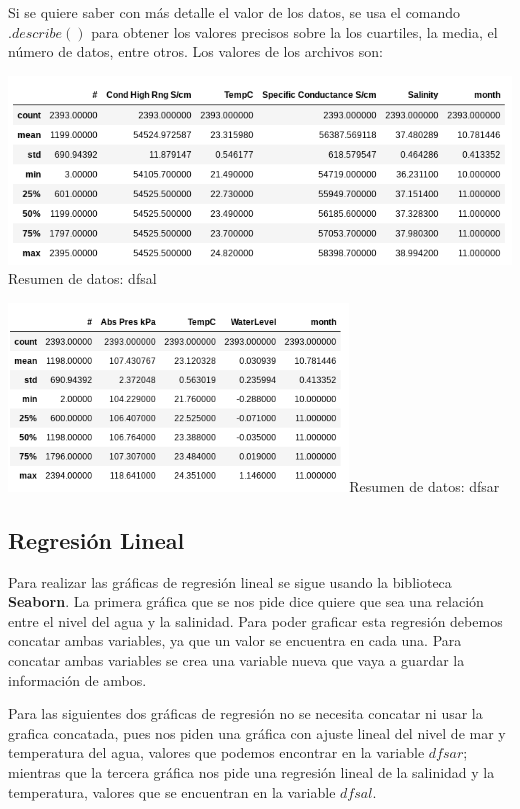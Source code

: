 \documentclass{article}
\begin{document}
Si se quiere saber con más detalle el valor de los datos, se usa el comando $.describe()$ para obtener los valores precisos sobre la los cuartiles, la media, el número de datos, entre otros. Los valores de los archivos son:

	\begin{center}
    \includegraphics[height=5cm]{resal.png}{Resumen de datos: dfsal}
    \end{center}
	
    \begin{center}
    \includegraphics[height=5cm]{resar.png}{Resumen de datos: dfsar}
    \end{center}
    
\subsection{Regresión Lineal}
Para realizar las gráficas de regresión lineal se sigue usando la biblioteca \textbf{Seaborn}. La primera gráfica que se nos pide dice quiere que sea una relación entre el nivel del agua y la salinidad. Para poder graficar esta regresión debemos concatar ambas variables, ya que un valor se encuentra en cada una. Para concatar ambas variables se crea una variable nueva que vaya a guardar la información de ambos.

Para las siguientes dos gráficas de regresión no se necesita concatar ni usar la grafica concatada, pues nos piden una gráfica con ajuste lineal del nivel de mar y temperatura del agua, valores que podemos encontrar en la variable $dfsar$; mientras que la tercera gráfica nos pide una regresión lineal de la salinidad y la temperatura, valores que se encuentran en la variable $dfsal$.
\end{document}
